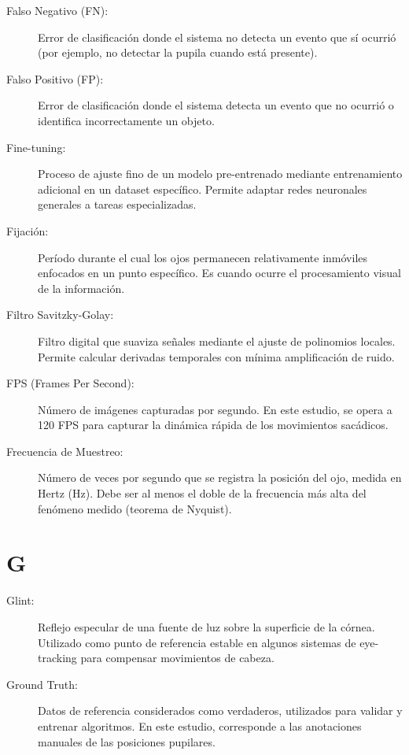 \begin{description}
    \item[Falso Negativo (FN):] Error de clasificación donde el sistema no detecta un evento que sí ocurrió (por ejemplo, no detectar la pupila cuando está presente).
    
    \item[Falso Positivo (FP):] Error de clasificación donde el sistema detecta un evento que no ocurrió o identifica incorrectamente un objeto.
    
    \item[Fine-tuning:] Proceso de ajuste fino de un modelo pre-entrenado mediante entrenamiento adicional en un dataset específico. Permite adaptar redes neuronales generales a tareas especializadas.
    
    \item[Fijación:] Período durante el cual los ojos permanecen relativamente inmóviles enfocados en un punto específico. Es cuando ocurre el procesamiento visual de la información.
    
    \item[Filtro Savitzky-Golay:] Filtro digital que suaviza señales mediante el ajuste de polinomios locales. Permite calcular derivadas temporales con mínima amplificación de ruido.
    
    \item[FPS (Frames Per Second):] Número de imágenes capturadas por segundo. En este estudio, se opera a 120 FPS para capturar la dinámica rápida de los movimientos sacádicos.
    
    \item[Frecuencia de Muestreo:] Número de veces por segundo que se registra la posición del ojo, medida en Hertz (Hz). Debe ser al menos el doble de la frecuencia más alta del fenómeno medido (teorema de Nyquist).
\end{description}

\section*{G}

\begin{description}
    \item[Glint:] Reflejo especular de una fuente de luz sobre la superficie de la córnea. Utilizado como punto de referencia estable en algunos sistemas de eye-tracking para compensar movimientos de cabeza.
    
    \item[Ground Truth:] Datos de referencia considerados como verdaderos, utilizados para validar y entrenar algoritmos. En este estudio, corresponde a las anotaciones manuales de las posiciones pupilares.
\end{description}

